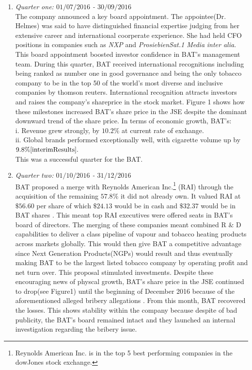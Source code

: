 \documentclass[letterpaper, 10 pt, conference]{ieeeconf}  %
\begin{document}
 
 \begin{flushleft}
 	\begin{enumerate}
 		\item[1.]\textit{Quarter one: $01/07/2016$ - $ 30/09/2016$}
 		\\
 		The company announced a key board appointment. The appointee(Dr. Helmes) was said to have distinguished financial expertise judging from her extensive career  and international coorperate experience. She had held CFO positions in companies such as \textit{NXP} and  \textit{ProsiebienSat.1 Media} \textit{inter alia}\cite{Board_Appointment}. This board appointment boosted investor confidence in BAT's management team. During this quarter,  BAT received international recognitions including being ranked as number one in good governance and being the only tobacco company to be in the top 50 of the world's most diverse and inclusive companies by thomson reuters. International recognition attracts investors and raises the company's shareprice in the stock market. Figure 1 shows how these milestones increased BAT's share price in the JSE despite the dominant downward trend of the share price. In terms of economic growth, BAT's:
 		\\
 		\hspace{2.00cm}i. Revenue grew strongly, by $10.2\%$ at current rate of exchange\cite{interimResults}.
 		\\
 		\hspace{1.8500cm} ii. Global brands performed exceptionally well, with cigarette volume up by $9.8\%\cite{interimResults}.$	
 		\\
 		This was a successful quarter for the BAT.
 		\item[2.]\textit{Quarter two: $01/10/2016$ - $31/12/2016$}
 		\\
 		BAT proposed a merge with Reynolds American Inc.\footnote{Reynolds American Inc. is in the top 5 best performing companies in the dowJones stock exchange.} (RAI) through the acquisition of the remaining $57.8 \% $ it did not already own. It valued RAI at $\$ 56.60$ per share of which $\$ 24.13$ would be in cash and $\$ 32.37$ would be in BAT shares \cite{Proposes_Merger}. This meant top RAI executives were offered seats in BAT's board of directors. The merging of these companies meant combined R $\&$ D capabilities to deliver a class pipeline of vapour and tobacco heating products across markets globally. This would then give BAT a competitive advantage since Next Generation Products(NGPs) would result and thus eventually making BAT to be the largest listed tobacco company by operating profit and net turn over. This proposal stimulated investments. Despite these encouraging news of physcal growth, BAT's share price in the JSE continued to drop(see Figure1) until the beginning of December 2016 because of the aforementioned alleged bribery allegations  . From this month, BAT recovered the losses. This shows stability within the company because despite of bad publicity, the BAT's board remained intact and they launched an internal investigation regarding the bribery issue.
 		

\end{enumerate}
\end{flushleft}
\end{document}
